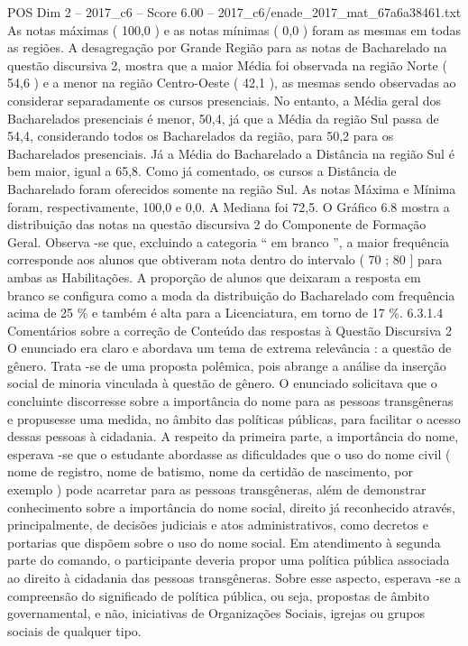 \begin{textsample}{POS Dim 2 – 2017\_c6 – Score 6.00 – 2017\_c6/enade\_2017\_mat\_67a6a38461.txt}
As notas máximas ( 100,0 ) e as notas mínimas ( 0,0 ) foram as mesmas em todas as regiões.
A desagregação por Grande Região para as notas de Bacharelado na questão discursiva 2, mostra que a maior Média foi observada na região Norte ( 54,6 ) e a menor na região Centro-Oeste ( 42,1 ), as mesmas sendo observadas ao considerar separadamente os cursos presenciais.
No entanto, a Média geral dos Bacharelados presenciais é menor, 50,4, já que a Média da região Sul passa de 54,4, considerando todos os Bacharelados da região, para 50,2 para os Bacharelados presenciais.
Já a Média do Bacharelado a Distância na região Sul é bem maior, igual a 65,8.
Como já comentado, os cursos a Distância de Bacharelado foram oferecidos somente na região Sul.
As notas Máxima e Mínima foram, respectivamente, 100,0 e 0,0.
A Mediana foi 72,5.
O Gráfico 6.8 mostra a distribuição das notas na questão discursiva 2 do Componente de Formação Geral.
Observa -se que, excluindo a categoria “ em branco ”, a maior frequência corresponde aos alunos que obtiveram nota dentro do intervalo ( 70 ; 80 ] para ambas as Habilitações.
A proporção de alunos que deixaram a resposta em branco se configura como a moda da distribuição do Bacharelado com frequência acima de 25 \% e também é alta para a Licenciatura, em torno de 17 \%. 6.3.1.4 Comentários sobre a correção de Conteúdo das respostas à Questão Discursiva 2 O enunciado era claro e abordava um tema de extrema relevância : a questão de gênero.
Trata -se de uma proposta polêmica, pois abrange a análise da inserção social de minoria vinculada à questão de gênero.
O enunciado solicitava que o concluinte discorresse sobre a importância do nome para as pessoas transgêneras e propusesse uma medida, no âmbito das políticas públicas, para facilitar o acesso dessas pessoas à cidadania.
A respeito da primeira parte, a importância do nome, esperava -se que o estudante abordasse as dificuldades que o uso do nome civil ( nome de registro, nome de batismo, nome da certidão de nascimento, por exemplo ) pode acarretar para as pessoas transgêneras, além de demonstrar conhecimento sobre a importância do nome social, direito já reconhecido através, principalmente, de decisões judiciais e atos administrativos, como decretos e portarias que dispõem sobre o uso do nome social.
Em atendimento à segunda parte do comando, o participante deveria propor uma política pública associada ao direito à cidadania das pessoas transgêneras.
Sobre esse aspecto, esperava -se a compreensão do significado de política pública, ou seja, propostas de âmbito governamental, e não, iniciativas de Organizações Sociais, igrejas ou grupos sociais de qualquer tipo.

\end{textsample}
